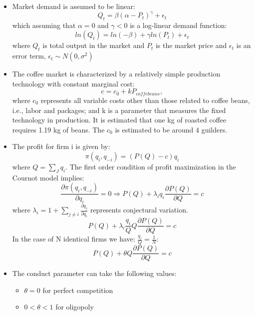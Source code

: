 \documentclass[11pt]{article}
\begin{document}
\begin{itemize}
\item Market demand is assumed to be linear:
\begin{equation}
Q_t=\beta (\alpha - P_t)^\gamma+\epsilon_t
\end{equation}
which assuming that $\alpha=0$ and $\gamma<0$ is a log-linear demand function:
\begin{equation}
ln(Q_t)=ln(-\beta)+\gamma ln(P_t)+\epsilon_t
\end{equation}
where $Q_t$ is total output in the market and $P_t$ is the market price and $\epsilon_t$ is an
error term, $\epsilon_t\sim N(0,\sigma^{2})$
\item The coffee market is characterized by a relatively simple production technology
with constant marginal cost:
\begin{equation}
c=c_0+kP_{coffe beans},
\end{equation}
where $c_0$ represents all variable costs other than those related to coffee beans,
i.e., labor and packages; and k is a parameter that measures the fixed technology in production.
It is estimated that
one kg of roasted coffee requires 1.19 kg of beans. The $c_0$ is estimated to be
around 4 guilders.
\item The profit for firm i is given by:
\begin{equation}
\pi(q_i,q_{-i})=(P(Q)-c)q_i
\end{equation}
where $Q=\sum_J{q_i}$. The first order condition of profit maximization
in the Cournot model implies:
\begin{equation}
\frac{\partial\pi(q_i,q_{-i})}{\partial q_i}=0\Rightarrow P(Q)+\lambda_i q_i\frac{\partial P(Q)}{\partial Q}=c
\end{equation}
where $\lambda_i=1+\sum_{j\neq i}\frac{\partial q_j}{\partial q_i}$ represents conjectural variation.
\begin{equation}
P(Q)+\lambda_i \frac{q_i}{Q}Q\frac{\partial P(Q)}{\partial Q}=c
\end{equation}
In the case of N identical firms we have: $\frac{q_i}{Q}=\frac{1}{N}$:
\begin{equation}
P(Q)+\theta Q\frac{\partial P(Q)}{\partial Q}=c
\end{equation}
\item The conduct parameter can take the following values:
\begin{itemize}
\item $\theta=0$ for perfect competition
\item $0<\theta<1$ for oligopoly

\end{itemize}
\end{itemize}
\end{document}
